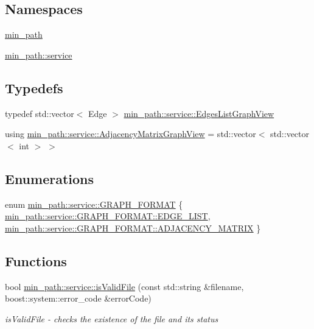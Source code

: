 \subsection*{Namespaces}
\begin{DoxyCompactItemize}
\item 
 \hyperlink{a00033}{min\+\_\+path}
\item 
 \hyperlink{a00037}{min\+\_\+path\+::service}
\end{DoxyCompactItemize}
\subsection*{Typedefs}
\begin{DoxyCompactItemize}
\item 
typedef std\+::vector$<$ Edge $>$ \hyperlink{a00037_aa7134896d837083f384364b56a32bb49_aa7134896d837083f384364b56a32bb49}{min\+\_\+path\+::service\+::\+Edges\+List\+Graph\+View}
\item 
using \hyperlink{a00037_af657481a4b0a05546de6e9c1023bd9f5_af657481a4b0a05546de6e9c1023bd9f5}{min\+\_\+path\+::service\+::\+Adjacency\+Matrix\+Graph\+View} = std\+::vector$<$ std\+::vector$<$ int $>$ $>$
\end{DoxyCompactItemize}
\subsection*{Enumerations}
\begin{DoxyCompactItemize}
\item 
enum \hyperlink{a00037_a1f61bb8d119aded91f38ff564193177c_a1f61bb8d119aded91f38ff564193177c}{min\+\_\+path\+::service\+::\+G\+R\+A\+P\+H\+\_\+\+F\+O\+R\+M\+AT} \{ \hyperlink{a00037_a1f61bb8d119aded91f38ff564193177c_a1f61bb8d119aded91f38ff564193177ca561011d4221028551bdb4a4fdf37b7e2}{min\+\_\+path\+::service\+::\+G\+R\+A\+P\+H\+\_\+\+F\+O\+R\+M\+A\+T\+::\+E\+D\+G\+E\+\_\+\+L\+I\+ST}, 
\hyperlink{a00037_a1f61bb8d119aded91f38ff564193177c_a1f61bb8d119aded91f38ff564193177ca9d8e68c3898f769422174fed0be93fd2}{min\+\_\+path\+::service\+::\+G\+R\+A\+P\+H\+\_\+\+F\+O\+R\+M\+A\+T\+::\+A\+D\+J\+A\+C\+E\+N\+C\+Y\+\_\+\+M\+A\+T\+R\+IX}
 \}
\end{DoxyCompactItemize}
\subsection*{Functions}
\begin{DoxyCompactItemize}
\item 
bool \hyperlink{a00037_a57c94e914d9aaa3af892f8a74f8b23a6_a57c94e914d9aaa3af892f8a74f8b23a6}{min\+\_\+path\+::service\+::is\+Valid\+File} (const std\+::string \&filename, boost\+::system\+::error\+\_\+code \&error\+Code)
\begin{DoxyCompactList}\small\item\em is\+Valid\+File -\/ checks the existence of the file and its status \end{DoxyCompactList}\end{DoxyCompactItemize}

